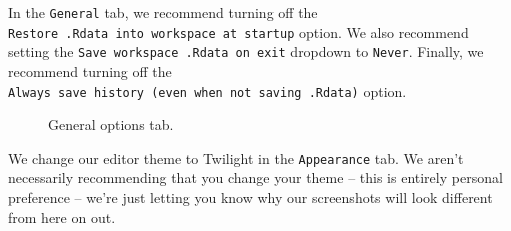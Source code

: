 \documentclass[
  letterpaper,
  DIV=11,
  numbers=noendperiod]{scrreprt}
\begin{document}
In the \texttt{General} tab, we recommend turning off the
\texttt{Restore\ .Rdata\ into\ workspace\ at\ startup} option. We also
recommend setting the \texttt{Save\ workspace\ .Rdata\ on\ exit}
dropdown to \texttt{Never}. Finally, we recommend turning off the
\texttt{Always\ save\ history\ (even\ when\ not\ saving\ .Rdata)}
option.

\begin{figure}


\caption{\label{fig-preferences3}General options tab.}

\end{figure}%

We change our editor theme to Twilight in the \texttt{Appearance} tab.
We aren't necessarily recommending that you change your theme -- this is
entirely personal preference -- we're just letting you know why our
screenshots will look different from here on out.
\end{document}
